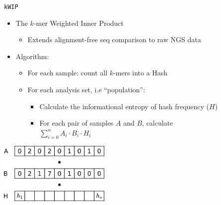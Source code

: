 \documentclass[t]{beamer}
\begin{document}
\begin{frame}{\texttt{kWIP}}
  \begin{itemize}
    \item The $k$-mer Weighted Inner Product
      \begin{itemize}
        \item Extends alignment-free seq comparison to raw NGS data
      \end{itemize}
    \pause
    \item Algorithm:
      \begin{itemize}
        \item For each sample: count all $k$-mers into a Hash
        \pause
        \item For each analysis set, i.e ``population'':
          \begin{itemize}
            \item Calculate the informational entropy of hash frequency ($H$)
            \item For each pair of samples $A$ and $B$, calculate \\
              $\sum^{n}_{i=0} A_i \cdot B_i \cdot H_i$
          \end{itemize}
      \end{itemize}
  \end{itemize}
  \begin{center}
    \includegraphics[width=0.4\textwidth]{img/hash-wip.png}
  \end{center}
\end{frame}
\end{document}
